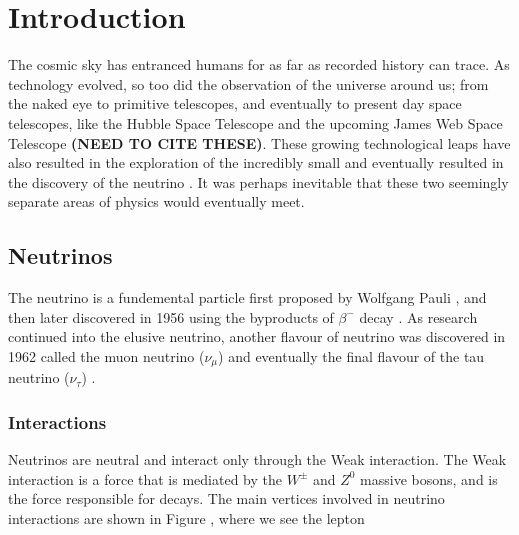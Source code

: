 \chapter{Introduction}

The cosmic sky has entranced humans for as far as recorded history can trace. As technology evolved, so too did the observation of the universe around us; from the naked eye to primitive telescopes, and eventually to present day space telescopes, like the Hubble Space Telescope and the upcoming James Web Space Telescope \textbf{(NEED TO CITE THESE)}. These growing technological leaps have also resulted in the exploration of the incredibly small and eventually resulted in the discovery of the neutrino \cite{aneut}. It was perhaps inevitable that these two seemingly separate areas of physics would eventually meet. 

\section{Neutrinos}

The neutrino is a fundemental particle first proposed by Wolfgang Pauli \cite{nu_proposition}, and then later discovered in 1956 using the byproducts of $\beta^{-}$ decay \cite{aneut}. As research continued into the elusive neutrino, another flavour of neutrino was discovered in 1962 called the muon neutrino ($\nu_{\mu}$) \cite{m_nu} and eventually the final flavour of the tau neutrino ($\nu_\tau$) \cite{t_nu}. 

\subsection{Interactions}

Neutrinos are neutral and interact only through the Weak interaction. The Weak interaction is a force that is mediated by the $W^{\pm}$ and $Z^{0}$ massive bosons, and is the force responsible for decays. The main vertices involved in neutrino interactions are shown in Figure \cite{fig:n_vert}, where we see the lepton 

